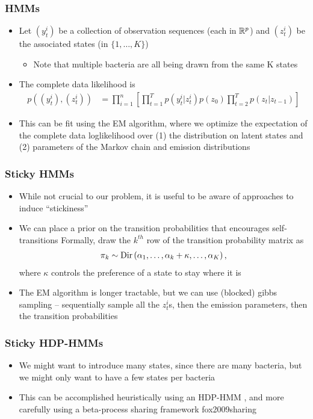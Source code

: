 \documentclass{beamer}
\begin{document}
\begin{frame}
  \frametitle{HMMs}
\begin{itemize}
\item Let $\left(y_{t}^{i}\right)$ be a collection of observation sequences
  (each in $\mathbb{R}^{p}$) and $\left(z_{t}^{i}\right)$ be the associated states
  (in $\{1, \dots, K\}$)
  \begin{itemize}
  \item Note that multiple bacteria are all being drawn from the same K states
  \end{itemize}
\item The complete data likelihood is
  \begin{align*}
    p\left(\left(y_{t}^{i}\right), \left(z_{t}^{i}\right)\right) &= \prod_{i = 1}^{n} \left[\prod_{t = 1}^{T} p\left(y_{t}^{i} \vert z_{t}^{i}\right) p\left(z_{0}\right)\prod_{t = 2}^{T} p\left(z_{t} \vert z_{t - 1}\right)\right]
  \end{align*}
\item This can be fit using the EM algorithm, where we optimize the expectation
  of the complete data loglikelihood over (1) the distribution on latent states
  and (2) parameters of the Markov chain and emission distributions
\end{itemize}  
\end{frame}

\begin{frame}
  \frametitle{Sticky HMMs}
\begin{itemize}
\item While not crucial to our problem, it is useful to be aware of approaches
  to induce ``stickiness''
\item We can place a prior on the transition probabilities that encourages
  self-transitions
  \itme Formally, draw the $k^{th}$ row of the transition probability matrix as
\begin{align*}
  \pi_{k} \sim \textnormal{Dir}\left(\alpha_{1}, \dots, \alpha_{k} + \kappa, \dots, \alpha_{K}\right),
\end{align*}
where $\kappa$ controls the preference of a state to stay where it is
\item The EM algorithm is longer tractable, but we can use (blocked) gibbs
  sampling -- sequentially sample all the $z_{t}^{i}$s, then the emission
  parameters, then the transition probabilities
\end{itemize}
\end{frame}

\begin{frame}
  \frametitle{Sticky HDP-HMMs}
 \begin{itemize}
 \item We might want to introduce many states, since there are many bacteria,
   but we might only want to have a few states per bacteria
 \item This can be accomplished heuristically using an HDP-HMM \citep{fox2007sticky}, and more
   carefully using a beta-process sharing framework {fox2009sharing}
 \end{itemize} 
\end{frame}
\end{document}
